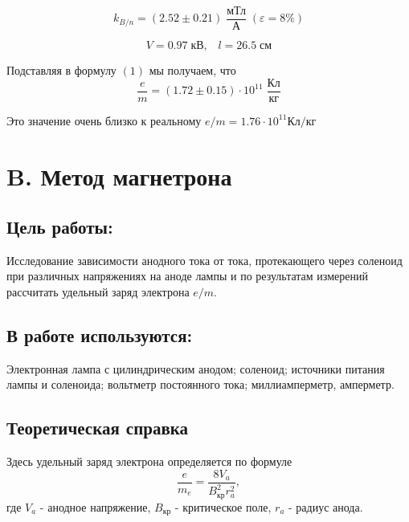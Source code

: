 \documentclass[a4paper, 12pt]{article}
\begin{document}
\begin{equation}
    k_{B/n} = (2.52 \pm 0.21) \; \frac{\text{мТл}}{\text{А}} \; (\varepsilon = 8 \%)
\end{equation}

\begin{equation}
    V = 0.97 \; \text{кВ}, \; \; \; l = 26.5 \; \text{см}
\end{equation}

Подставляя в формулу $(1)$ мы получаем, что
\begin{equation}
\dfrac{e}{m} = \left(1.72 \pm 0.15\right) \cdot 10^{11} \; \frac{\text{Кл}}{\text{кг}}
\end{equation}

Это значение очень близко к реальному $e/m = 1.76 \cdot 10^{11} \text{Кл}/\text{кг}$

\newpage

\section*{B. Метод магнетрона}
\subsection*{Цель работы:}
Исследование зависимости анодного тока от тока, протекающего через соленоид при различных напряжениях на аноде лампы и по результатам измерений рассчитать удельный заряд электрона $e/m$.
\subsection*{В работе используются:}
Электронная лампа с цилиндрическим анодом; соленоид; источники питания лампы и соленоида; вольтметр постоянного тока; миллиамперметр, амперметр.
\subsection*{Теоретическая справка}
Здесь удельный заряд электрона определяется по формуле
\begin{equation}
\dfrac{e}{m_e} = \dfrac{8V_a}{B_{\text{кр}}^2r_a^2},
\end{equation}
где $V_a$ - анодное напряжение, $B_{\text{кр}}$ - критическое поле, $r_a$ - радиус анода.
\end{document}
